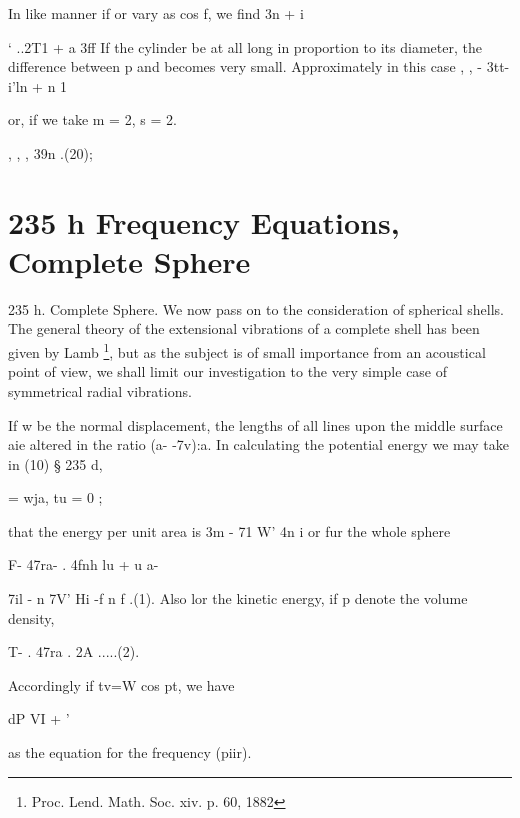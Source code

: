 In like manner if or vary as cos f, we find 3n + i

 ‘  ..2T1 + a 3ff If the cylinder be at all long in proportion to its
diameter, the difference between p and becomes very small. Approximately in
this case , , - 3tt- i'ln + n 1

or, if we take m = 2, s = 2.

, , , 39n .(20);

\section{235 h Frequency Equations, Complete Sphere}
235 h. Complete Sphere. We now pass on to the consideration of spherical
shells. The general theory of the extensional vibrations of a complete shell
has been given by Lamb \footnote{Proc. Lend. Math. Soc. xiv. p. 60, 1882},
but as the subject is of small importance from an
acoustical point of view, we shall limit our investigation to the very simple
case of symmetrical radial vibrations.

If w be the normal displacement, the lengths of all lines upon the middle
surface aie altered in the ratio (a- -7v):a. In calculating the potential
energy we may take in (10) § 235 d,

= wja, tu = 0 ;



that the energy per unit area is 3m - 71 W' 4n i
or fur the whole sphere

F- 47ra- . 4fnh lu + u a-

 7il - n 7V' Hi -f n f .(1).  Also lor the kinetic energy, if p denote the
volume density,

T- . 47ra . 2A  .....(2).

Accordingly if tv=W cos pt, we have

dP VI + '

as the equation for the frequency (piir).


